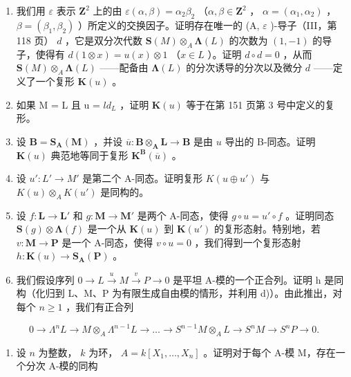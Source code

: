\begin{enumerate}
\def\labelenumi{\alph{enumi})}
\item
  我们用 \(\varepsilon\) 表示 \(\mathbf{Z}^2\) 上的由 \(\varepsilon(\alpha, \beta) = \alpha_2 \beta_2\) （\(\alpha, \beta \in \mathbf{Z}^2\) ， \(\alpha = (\alpha_1, \alpha_2)\) ， \(\beta = (\beta_1, \beta_2)\) ）所定义的交换因子。证明存在唯一的 (A, \(\varepsilon\) )-导子（III，第 118 页） \(d\) ，它是双分次代数 \(\mathbf{S}(M) \otimes_A \symbf{\Lambda}(L)\) 的次数为 \((1, -1)\) 的导子，使得有 \(d(1 \otimes x) = u(x) \otimes 1\) （\(x \in L\) ）。证明 \(d \circ d = 0\) ，从而 \(\mathbf{S}(M) \otimes_A \symbf{\Lambda}(L)\) ——配备由 \(\symbf{\Lambda}(L)\) 的分次诱导的分次以及微分 \(d\) ——定义了一个复形 \(\mathbf{K}(u)\) 。
\item
  如果 M = L 且 u = \(ld_{L}\) ，证明 \(\mathbf{K}(u)\) 等于在第 151 页第 3 号中定义的复形。
\item
  设 \(\mathbf{B} = \mathbf{S}_{\mathbf{A}}(\mathbf{M})\) ，并设 \(\overline{u}: \mathbf{B} \otimes_{\mathbf{A}} \mathbf{L} \to \mathbf{B}\) 是由 \(u\) 导出的 B-同态。证明 \(\mathbf{K}(u)\) 典范地等同于复形 \(\mathbf{K}^{\mathbf{B}}(\overline{u})\) 。
\item
  设 \(u': L' \to M'\) 是第二个 A-同态。证明复形 \(K(u \oplus u')\) 与 \(K(u) \otimes_{A} K(u')\) 是同构的。
\item
  设 \(f: \mathbf{L} \to \mathbf{L}'\) 和 \(g: \mathbf{M} \to \mathbf{M}'\) 是两个 A-同态，使得 \(g \circ u = u' \circ f\) 。证明同态 \(\mathbf{S}(g) \otimes \symbf{\Lambda}(f)\) 是一个从 \(\mathbf{K}(u)\) 到 \(\mathbf{K}(u')\) 的复形态射。特别地，若 \(v: \mathbf{M} \to \mathbf{P}\) 是一个 A-同态，使得 \(v \circ u = 0\) ，我们得到一个复形态射 \(h: \mathbf{K}(u) \to \mathbf{S}_{\mathbf{A}}(\mathbf{P})\) 。
\item
  我们假设序列 \(0 \rightarrow L \xrightarrow{u} M \xrightarrow{v} P \rightarrow 0\) 是平坦 A-模的一个正合列。证明 h 是同构（化归到 L、M、P 为有限生成自由模的情形，并利用 d)）。由此推出，对每个 \(n \geqslant 1\) ，我们有正合列
\end{enumerate}

\[
0 \rightarrow \Lambda^ {n} L \rightarrow M \otimes_ {A} \Lambda^ {n - 1} L \rightarrow \dots \rightarrow S ^ {n - 1} M \otimes_ {A} L \rightarrow S ^ {n} M \rightarrow S ^ {n} P \rightarrow 0.
\]

\begin{enumerate}
\def\labelenumi{\arabic{enumi})}
\setcounter{enumi}{2}
\tightlist
\item
  设 \(n\) 为整数， \(k\) 为环， \(A = k[X_1, \ldots, X_n]\) 。证明对于每个 A-模 M，存在一个分次 A-模的同构
\end{enumerate}

